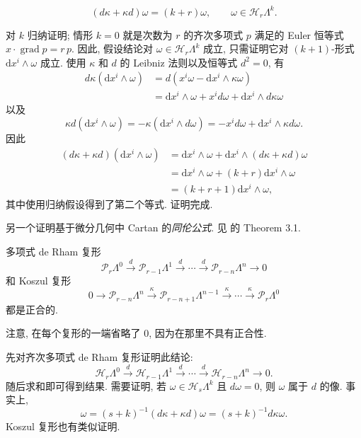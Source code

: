 \begin{Theorem}\label{thm:koszul-homotopy}
\[
(d\kappa+\kappa d)\omega=(k+r)\omega,\qquad\omega\in\mathcal H_r\Lambda^k.
\]
\end{Theorem}

\begin{Proof}
对 $k$ 归纳证明; 情形 $k=0$ 就是次数为 $r$ 的齐次多项式 $p$ 满足的 Euler 恒等式 $x\cdot\operatorname{grad}p=r\,p$. 因此, 假设结论对 $\omega\in\mathcal H_r\Lambda^k$ 成立, 只需证明它对 $(k+1)$-形式 $\mathrm{d}x^i\wedge\omega$ 成立. 使用 $\kappa$ 和 $d$ 的 Leibniz 法则以及恒等式 $d^2=0$, 有
\[
\begin{aligned}
d\kappa(\mathrm{d}x^i\wedge\omega)&=d(x^i\omega-\mathrm{d}x^i\wedge\kappa\omega)\\
&=\mathrm{d}x^i\wedge\omega+x^i d\omega+\mathrm{d}x^i\wedge d\kappa\omega
\end{aligned}
\]
以及
\[
\kappa d(\mathrm{d}x^i\wedge\omega)=-\kappa(\mathrm{d}x^i\wedge d\omega)=-x^i d\omega+\mathrm{d}x^i\wedge\kappa d\omega.
\]
因此
\[
\begin{aligned}
(d\kappa+\kappa d)(\mathrm{d}x^i\wedge\omega)&=\mathrm{d}x^i\wedge\omega+\mathrm{d}x^i\wedge(d\kappa+\kappa d)\omega\\
&=\mathrm{d}x^i\wedge\omega+(k+r)\mathrm{d}x^i\wedge\omega\\
&=(k+r+1)\mathrm{d}x^i\wedge\omega,
\end{aligned}
\]
其中使用归纳假设得到了第二个等式. 证明完成.
\end{Proof}

\begin{Remark}\label{rem:koszul-cartan-proof}
另一个证明基于微分几何中 Cartan 的\emph{同伦公式}. 见  的 Theorem 3.1.
\end{Remark}

\begin{Corollary}\label{cor:polynomial-de-rham-exactness}
多项式 de Rham 复形
\[
\mathcal P_r\Lambda^0\xrightarrow{d}\mathcal P_{r-1}\Lambda^1\xrightarrow{d}\cdots\xrightarrow{d}\mathcal P_{r-n}\Lambda^n\to0
\]
和 Koszul 复形
\[
0\to\mathcal P_{r-n}\Lambda^n\xrightarrow{\kappa}\mathcal P_{r-n+1}\Lambda^{n-1}\xrightarrow{\kappa}\cdots\xrightarrow{\kappa}\mathcal P_r\Lambda^0
\]
都是正合的.
\end{Corollary}

注意, 在每个复形的一端省略了 $0$, 因为在那里不具有正合性.

\begin{Proof}
先对齐次多项式 de Rham 复形证明此结论:
\[
\mathcal H_r\Lambda^0\xrightarrow{d}\mathcal H_{r-1}\Lambda^1\xrightarrow{d}\cdots\xrightarrow{d}\mathcal H_{r-n}\Lambda^n\to0.
\]
随后求和即可得到结果. 需要证明, 若 $\omega\in\mathcal H_s\Lambda^k$ 且 $d\omega=0$, 则 $\omega$ 属于 $d$ 的像. 事实上,
\[
\omega=(s+k)^{-1}(d\kappa+\kappa d)\omega=(s+k)^{-1}d\kappa\omega.
\]
Koszul 复形也有类似证明.
\end{Proof}

